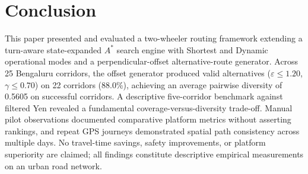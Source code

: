 \documentclass[11pt,conference]{IEEEtran}
\begin{document}

\section{Conclusion}

This paper presented and evaluated a two-wheeler routing framework extending a turn-aware state-expanded $A^*$ search engine \cite{anirudhr2026turnaware} with Shortest and Dynamic operational modes and a perpendicular-offset alternative-route generator.
Across 25 Bengaluru corridors, the offset generator produced valid alternatives ($\varepsilon \le 1.20$, $\gamma \le 0.70$) on 22 corridors (88.0\%), achieving an average pairwise diversity of 0.5605 on successful corridors.
A descriptive five-corridor benchmark against filtered Yen revealed a fundamental coverage-versus-diversity trade-off.
Manual pilot observations documented comparative platform metrics without asserting rankings, and repeat GPS journeys demonstrated spatial path consistency across multiple days.
No travel-time savings, safety improvements, or platform superiority are claimed; all findings constitute descriptive empirical measurements on an urban road network.

\balance


\end{document}
